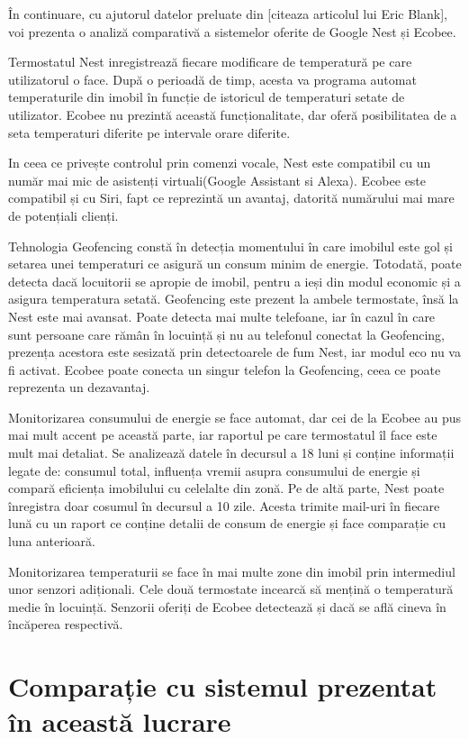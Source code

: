 	În continuare, cu ajutorul datelor preluate din [citeaza articolul lui Eric Blank], voi prezenta o analiză comparativă a sistemelor oferite de Google Nest și Ecobee. 

	Termostatul Nest inregistrează fiecare modificare de temperatură pe care utilizatorul o face. După o perioadă de timp, acesta va programa automat temperaturile din imobil în funcție de istoricul de temperaturi setate de utilizator. Ecobee nu prezintă această funcționalitate, dar oferă posibilitatea de a seta temperaturi diferite pe intervale orare diferite. 

	In ceea ce privește controlul prin comenzi vocale, Nest este compatibil cu un număr mai mic de asistenți virtuali(Google Assistant si Alexa). Ecobee este compatibil și cu Siri, fapt ce reprezintă un avantaj, datorită numărului mai mare de potențiali clienți. 

	Tehnologia Geofencing constă în detecția momentului în care imobilul este gol și setarea unei temperaturi ce asigură un consum minim de energie. Totodată, poate detecta dacă locuitorii se apropie de imobil, pentru a ieși din modul economic și a asigura temperatura setată. Geofencing este prezent la ambele termostate, însă la Nest este mai avansat. Poate detecta mai multe telefoane, iar în cazul în care sunt persoane care rămân în locuință și nu au telefonul conectat la Geofencing, prezența acestora este sesizată prin detectoarele de fum Nest, iar modul eco nu va fi activat. Ecobee poate conecta un singur telefon la Geofencing, ceea ce poate reprezenta un dezavantaj.

	  Monitorizarea consumului de energie se face automat, dar cei de la Ecobee au pus mai mult accent pe această parte, iar raportul pe care termostatul îl face este mult mai detaliat. Se analizează datele în decursul a 18 luni și conține informații legate de: consumul total, influența vremii asupra consumului de energie și compară eficiența imobilului cu celelalte din zonă. Pe de altă parte, Nest poate înregistra doar cosumul în decursul a 10 zile. Acesta trimite mail-uri în fiecare lună cu un raport ce conține detalii de consum de energie și face comparație cu luna anterioară.

	Monitorizarea temperaturii se face în mai multe zone din imobil prin intermediul unor senzori adiționali. Cele două termostate incearcă să mențină o temperatură medie în locuință. Senzorii oferiți de Ecobee detectează și dacă se află cineva în încăperea respectivă. 

\section{Comparație cu sistemul prezentat în această lucrare}

